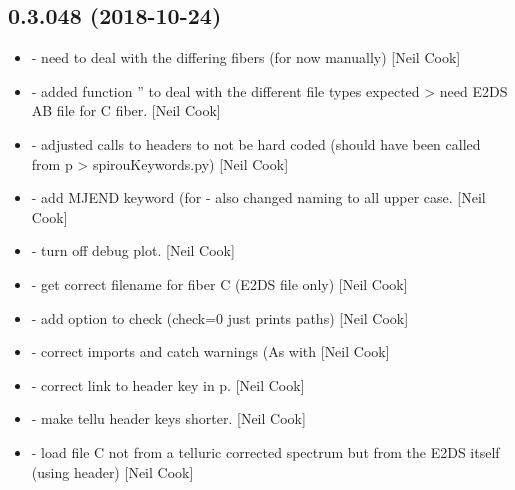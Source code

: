 \documentclass[a4paper,10pt,english]{report}
\begin{document}
\subsection{0.3.048 (2018-10-24)}
\label{\detokenize{misc/changelog:id284}}\begin{itemize}
\item {} 
 - need to deal with the differing fibers (for now
manually) {[}Neil Cook{]}

\item {} 
 - added function ” to deal with the
different file types expected \textendash{}\textgreater{} need E2DS AB file for C fiber. {[}Neil
Cook{]}

\item {} 
 - adjusted calls to headers to not be hard coded
(should have been called from p \textendash{}\textgreater{} spirouKeywords.py) {[}Neil Cook{]}

\item {} 
 - add MJEND keyword (for  - also
changed naming to all upper case. {[}Neil Cook{]}

\item {} 
 - turn off debug plot. {[}Neil Cook{]}

\item {} 
 - get correct filename for fiber C (E2DS
file only) {[}Neil Cook{]}

\item {} 
 - add option to check (check=0 just prints
paths) {[}Neil Cook{]}

\item {} 
 - correct imports and catch warnings (As
with  {[}Neil Cook{]}

\item {} 
 - correct link to header key in p. {[}Neil
Cook{]}

\item {} 
 - make tellu header keys shorter. {[}Neil Cook{]}

\item {} 
 - load file C not from a telluric corrected
spectrum but from the E2DS itself (using header) {[}Neil Cook{]}


\end{itemize}
\end{document}
